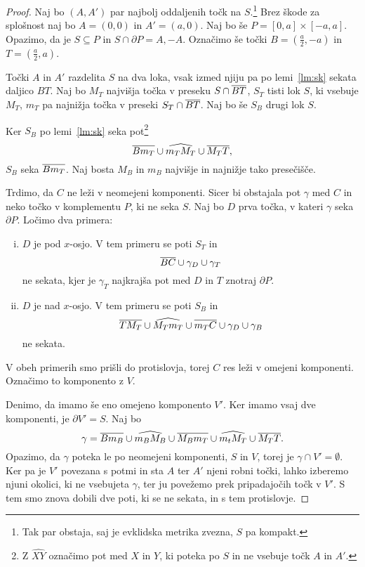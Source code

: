 \begin{proof}
Naj bo $(A, A')$ par najbolj oddaljenih točk na $S$.\footnote{Tak
par obstaja, saj je evklidska metrika zvezna, $S$ pa kompakt.} Brez
škode za splošnost naj bo $A = (0, 0)$ in $A' = (a, 0)$. Naj bo še
$P = [0, a] \times [-a, a]$. Opazimo, da je $S \subseteq P$ in
$S \cap \partial P = {A, -A}$. Označimo še točki
$B = \left(\frac{a}{2}, -a\right)$ in
$T = \left(\frac{a}{2}, a\right)$.

Točki $A$ in $A'$ razdelita $S$ na dva loka, vsak izmed njiju pa po
lemi~\ref{lm:sk} sekata daljico $BT$. Naj bo $M_T$ najvišja točka
v preseku $S \cap \overline{BT}$, $S_T$ tisti lok $S$, ki vsebuje
$M_T$, $m_T$ pa najnižja točka v preseki $S_T \cap \overline{BT}$. Naj
bo še $S_B$ drugi lok $S$.

Ker $S_B$ po lemi~\ref{lm:sk} seka pot\footnote{Z $\widehat{XY}$
označimo pot med $X$ in $Y$, ki poteka po $S$ in ne vsebuje točk
$A$ in $A'$.}
\[
\overline{Bm_T} \cup \widehat{m_T M_T} \cup \overline{M_T T},
\]
$S_B$ seka $\overline{Bm_T}$. Naj bosta $M_B$ in $m_B$ najvišje in
najnižje tako presečišče.

Trdimo, da $C$ ne leži v neomejeni komponenti. Sicer bi obstajala
pot $\gamma$ med $C$ in neko točko v komplementu $P$, ki ne seka
$S$. Naj bo $D$ prva točka, v kateri $\gamma$ seka $\partial P$.
Ločimo dva primera:

\begin{enumerate}[i)]
\item $D$ je pod $x$-osjo. V tem primeru se poti $S_T$ in
\[
\overline{BC} \cup \gamma_D \cup \gamma_T
\]
ne sekata, kjer je $\gamma_T$ najkrajša pot med $D$ in $T$ znotraj
$\partial P$.
\item $D$ je nad $x$-osjo. V tem primeru se poti $S_B$ in
\[
\overline{TM_T} \cup \widehat{M_T m_T} \cup
\overline{m_TC} \cup \gamma_D \cup \gamma_B
\]
ne sekata.
\end{enumerate}

V obeh primerih smo prišli do protislovja, torej $C$ res leži v
omejeni komponenti. Označimo to komponento z $V$.

Denimo, da imamo še eno omejeno komponento $V'$. Ker imamo vsaj dve
komponenti, je $\partial V' = S$. Naj bo
\[
\gamma = \overline{Bm_B} \cup \widehat{m_BM_B} \cup
\overline{M_Bm_T} \cup \widehat{m_tM_T} \cup \overline{M_TT}.
\]
Opazimo, da $\gamma$ poteka le po neomejeni komponenti, $S$ in $V$,
torej je $\gamma \cap V' = \emptyset$. Ker pa je $V'$ povezana s
potmi in sta $A$ ter $A'$ njeni robni točki, lahko izberemo njuni
okolici, ki ne vsebujeta $\gamma$, ter ju povežemo prek
pripadajočih točk v $V'$. S tem smo znova dobili dve poti, ki se ne
sekata, in s tem protislovje.
\end{proof}

